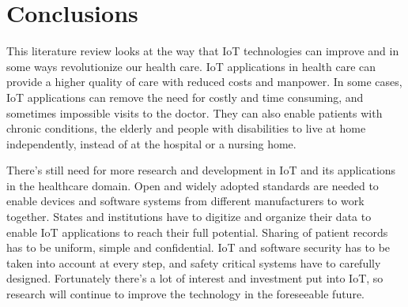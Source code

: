 \section{Conclusions}
\label{sec:conclusion}

This literature review looks at the way that IoT technologies can improve and
in some ways revolutionize our health care. IoT applications in health care can
provide a higher quality of care with reduced costs and manpower. In some
cases, IoT applications can remove the need for costly and time consuming, and
sometimes impossible visits to the doctor. They can also enable patients with
chronic conditions, the elderly and people with disabilities to live at home
independently, instead of at the hospital or a nursing home. 

There's still need for more research and development in IoT and its
applications in the healthcare domain. Open and widely adopted standards are
needed to enable devices and software systems from different manufacturers to
work together. States and institutions have to digitize and organize their data
to enable IoT applications to reach their full potential. Sharing of patient
records has to be uniform, simple and confidential. IoT and software security
has to be taken into account at every step, and safety critical systems have to
carefully designed. Fortunately there's a lot of interest and investment put
into IoT, so research will continue to improve the technology in the
foreseeable future.
